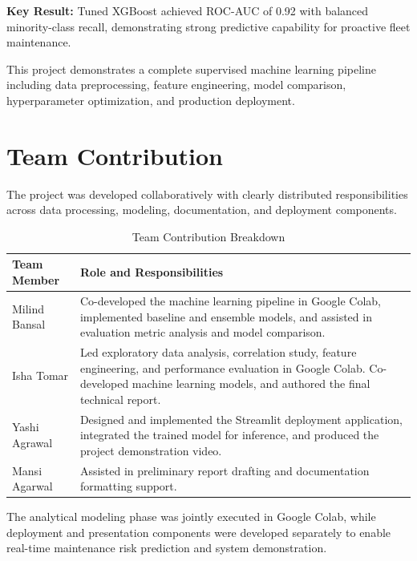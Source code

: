 \documentclass[12pt, a4paper]{article}
\begin{document}
\begin{center}
\colorbox{solarblue!8}{\parbox{0.9\textwidth}{\centering
\textbf{\color{solarblue}Key Result:} Tuned XGBoost achieved ROC-AUC of 0.92 with balanced minority-class recall, demonstrating strong predictive capability for proactive fleet maintenance.
}}
\end{center}

This project demonstrates a complete supervised machine learning pipeline including data preprocessing, feature engineering, model comparison, hyperparameter optimization, and production deployment.
\section{Team Contribution}

The project was developed collaboratively with clearly distributed responsibilities across data processing, modeling, documentation, and deployment components.

\begin{table}[H]
\centering
\caption{Team Contribution Breakdown}
\begin{tabular}{p{4cm} p{10cm}}
\toprule
\textbf{Team Member} & \textbf{Role and Responsibilities} \\
\midrule

Milind Bansal & Co-developed the machine learning pipeline in Google Colab, implemented baseline and ensemble models, and assisted in evaluation metric analysis and model comparison. \\

Isha Tomar & Led exploratory data analysis, correlation study, feature engineering, and performance evaluation in Google Colab. Co-developed machine learning models, and authored the final technical report. \\


Yashi Agrawal & Designed and implemented the Streamlit deployment application, integrated the trained model for inference, and produced the project demonstration video. \\

Mansi Agarwal & Assisted in preliminary report drafting and documentation formatting support. \\

\bottomrule
\end{tabular}
\end{table}

The analytical modeling phase was jointly executed in Google Colab, while deployment and presentation components were developed separately to enable real-time maintenance risk prediction and system demonstration.
\end{document}
